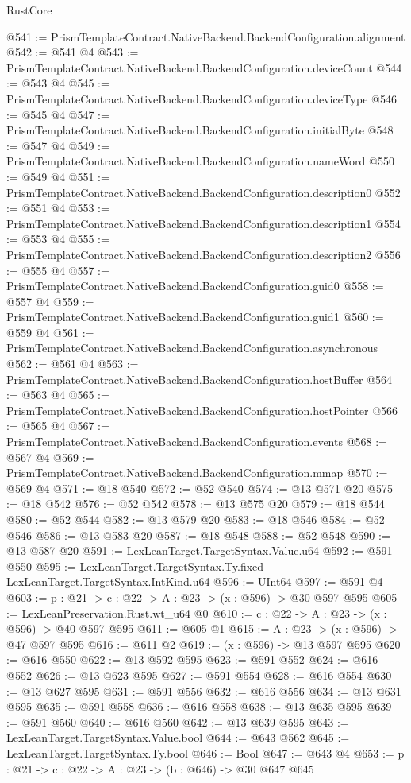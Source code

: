 \begin{lexlean}{RustCore}
\begin{coremodule}
@541 := PrismTemplateContract.NativeBackend.BackendConfiguration.alignment
@542 := @541 @4
@543 := PrismTemplateContract.NativeBackend.BackendConfiguration.deviceCount
@544 := @543 @4
@545 := PrismTemplateContract.NativeBackend.BackendConfiguration.deviceType
@546 := @545 @4
@547 := PrismTemplateContract.NativeBackend.BackendConfiguration.initialByte
@548 := @547 @4
@549 := PrismTemplateContract.NativeBackend.BackendConfiguration.nameWord
@550 := @549 @4
@551 := PrismTemplateContract.NativeBackend.BackendConfiguration.description0
@552 := @551 @4
@553 := PrismTemplateContract.NativeBackend.BackendConfiguration.description1
@554 := @553 @4
@555 := PrismTemplateContract.NativeBackend.BackendConfiguration.description2
@556 := @555 @4
@557 := PrismTemplateContract.NativeBackend.BackendConfiguration.guid0
@558 := @557 @4
@559 := PrismTemplateContract.NativeBackend.BackendConfiguration.guid1
@560 := @559 @4
@561 := PrismTemplateContract.NativeBackend.BackendConfiguration.asynchronous
@562 := @561 @4
@563 := PrismTemplateContract.NativeBackend.BackendConfiguration.hostBuffer
@564 := @563 @4
@565 := PrismTemplateContract.NativeBackend.BackendConfiguration.hostPointer
@566 := @565 @4
@567 := PrismTemplateContract.NativeBackend.BackendConfiguration.events
@568 := @567 @4
@569 := PrismTemplateContract.NativeBackend.BackendConfiguration.mmap
@570 := @569 @4
@571 := @18 @540
@572 := @52 @540
@574 := @13 @571 @20
@575 := @18 @542
@576 := @52 @542
@578 := @13 @575 @20
@579 := @18 @544
@580 := @52 @544
@582 := @13 @579 @20
@583 := @18 @546
@584 := @52 @546
@586 := @13 @583 @20
@587 := @18 @548
@588 := @52 @548
@590 := @13 @587 @20
@591 := LexLeanTarget.TargetSyntax.Value.u64
@592 := @591 @550
@595 := LexLeanTarget.TargetSyntax.Ty.fixed LexLeanTarget.TargetSyntax.IntKind.u64
@596 := UInt64
@597 := @591 @4
@603 := {p : @21} -> {c : @22} -> {A : @23} -> (x : @596) -> @30 @597 @595
@605 := LexLeanPreservation.Rust.wt_u64 @0
@610 := {c : @22} -> {A : @23} -> (x : @596) -> @40 @597 @595
@611 := @605 @1
@615 := {A : @23} -> (x : @596) -> @47 @597 @595
@616 := @611 @2
@619 := (x : @596) -> @13 @597 @595
@620 := @616 @550
@622 := @13 @592 @595
@623 := @591 @552
@624 := @616 @552
@626 := @13 @623 @595
@627 := @591 @554
@628 := @616 @554
@630 := @13 @627 @595
@631 := @591 @556
@632 := @616 @556
@634 := @13 @631 @595
@635 := @591 @558
@636 := @616 @558
@638 := @13 @635 @595
@639 := @591 @560
@640 := @616 @560
@642 := @13 @639 @595
@643 := LexLeanTarget.TargetSyntax.Value.bool
@644 := @643 @562
@645 := LexLeanTarget.TargetSyntax.Ty.bool
@646 := Bool
@647 := @643 @4
@653 := {p : @21} -> {c : @22} -> {A : @23} -> (b : @646) -> @30 @647 @645

\end{coremodule}
\end{lexlean}
